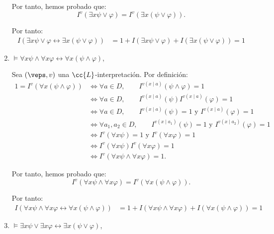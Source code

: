 \begin{ejercicio}
\begin{enumerate}
        Por tanto, hemos probado que:
        \begin{equation*}
            I^v(\exists x \psi \vee \varphi) = I^v(\exists x(\psi \vee \varphi)).
        \end{equation*}

        Por tanto:
        \begin{align*}
            I( \exists x \psi \vee \varphi \leftrightarrow \exists x(\psi \vee \varphi))
            &= 1+I(\exists x \psi \vee \varphi)+I(\exists x(\psi \vee \varphi))=1
        \end{align*}
        \item $\models \forall x \psi \wedge \forall x \varphi \leftrightarrow \forall x(\psi \wedge \varphi)$,
        
        Sea $(\veps,v)$ una $\cc{L}$-interpretación. Por definición:
        \begin{align*}
            1 = I^v(\forall x(\psi \wedge \varphi))
            &\iff \forall a\in D,\qquad I^{v(x\mid a)}(\psi \wedge \varphi) = 1\\
            &\iff \forall a\in D,\qquad I^{v(x\mid a)}(\psi)I^{v(x\mid a)}(\varphi) = 1\\
            &\iff \forall a\in D,\qquad I^{v(x\mid a)}(\psi) = 1\text{ y }I^{v(x\mid a)}(\varphi) = 1\\
            &\iff \forall a_1,a_2\in D,\qquad I^{v(x\mid a_1)}(\psi) = 1\text{ y }I^{v(x\mid a_2)}(\varphi) = 1\\
            &\iff I^v(\forall x\psi)=1\text{ y }I^v(\forall x\varphi)=1\\
            &\iff I^v(\forall x\psi)I^v(\forall x\varphi)=1\\
            &\iff I^v(\forall x\psi\wedge\forall x\varphi)=1.
        \end{align*}

        Por tanto, hemos probado que:
        \begin{equation*}
            I^v(\forall x \psi \wedge \forall x \varphi) = I^v(\forall x(\psi \wedge \varphi)).
        \end{equation*}

        Por tanto:
        \begin{align*}
            I( \forall x \psi \wedge \forall x \varphi \leftrightarrow \forall x(\psi \wedge \varphi))
            &= 1+I(\forall x \psi \wedge \forall x \varphi)+I(\forall x(\psi \wedge \varphi))=1
        \end{align*}
        \item $\models \exists x \psi \vee \exists x \varphi \leftrightarrow \exists x(\psi \vee \varphi)$,
        

\end{enumerate}
\end{ejercicio}
